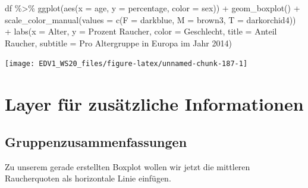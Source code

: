 \documentclass[
]{book}
\newenvironment{Shaded}{\begin{snugshade}}{\end{snugshade}}
\newcommand{\AttributeTok}[1]{\textcolor[rgb]{0.77,0.63,0.00}{#1}}
\newcommand{\FunctionTok}[1]{\textcolor[rgb]{0.00,0.00,0.00}{#1}}
\newcommand{\NormalTok}[1]{#1}
\newcommand{\SpecialCharTok}[1]{\textcolor[rgb]{0.00,0.00,0.00}{#1}}
\newcommand{\StringTok}[1]{\textcolor[rgb]{0.31,0.60,0.02}{#1}}
\begin{document}
\begin{Shaded}
\begin{Highlighting}[]
\NormalTok{df }\SpecialCharTok{\%\textgreater{}\%} 
  \FunctionTok{ggplot}\NormalTok{(}\FunctionTok{aes}\NormalTok{(}\AttributeTok{x =}\NormalTok{ age,}
             \AttributeTok{y =}\NormalTok{ percentage,}
             \AttributeTok{color =}\NormalTok{ sex)) }\SpecialCharTok{+}
  \FunctionTok{geom\_boxplot}\NormalTok{() }\SpecialCharTok{+}
  \FunctionTok{scale\_color\_manual}\NormalTok{(}\AttributeTok{values =} \FunctionTok{c}\NormalTok{(}\AttributeTok{F =} \StringTok{\textquotesingle{}darkblue\textquotesingle{}}\NormalTok{,}
                               \AttributeTok{M =} \StringTok{\textquotesingle{}brown3\textquotesingle{}}\NormalTok{,}
                               \AttributeTok{T =} \StringTok{\textquotesingle{}darkorchid4\textquotesingle{}}\NormalTok{)) }\SpecialCharTok{+}
  \FunctionTok{labs}\NormalTok{(}\AttributeTok{x =} \StringTok{\textquotesingle{}Alter\textquotesingle{}}\NormalTok{,}
       \AttributeTok{y =} \StringTok{\textquotesingle{}Prozent Raucher\textquotesingle{}}\NormalTok{,}
       \AttributeTok{color =} \StringTok{\textquotesingle{}Geschlecht\textquotesingle{}}\NormalTok{,}
       \AttributeTok{title =} \StringTok{\textquotesingle{}Anteil Raucher\textquotesingle{}}\NormalTok{,}
       \AttributeTok{subtitle =} \StringTok{\textquotesingle{}Pro Altergruppe in Europa im Jahr 2014\textquotesingle{}}\NormalTok{)}
\end{Highlighting}
\end{Shaded}

\begin{center}\texttt{[image: EDV1\_WS20\_files/figure-latex/unnamed-chunk-187-1]} \end{center}

\hypertarget{layer-fuxfcr-zusuxe4tzliche-informationen}{%
\section{Layer für zusätzliche Informationen}\label{layer-fuxfcr-zusuxe4tzliche-informationen}}

\hypertarget{gruppenzusammenfassungen}{%
\subsection{Gruppenzusammenfassungen}\label{gruppenzusammenfassungen}}

Zu unserem gerade erstellten Boxplot wollen wir jetzt die mittleren Raucherquoten als horizontale Linie einfügen.
\end{document}

